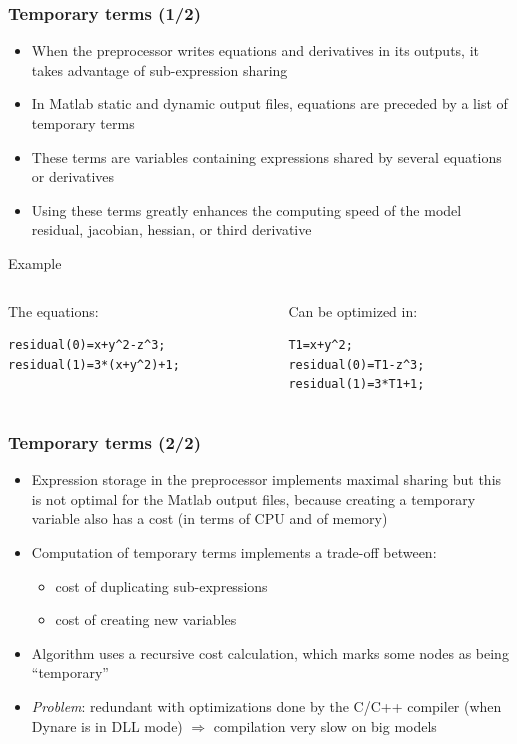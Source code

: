 \documentclass{beamer}
\begin{document}
\begin{frame}[fragile]
  \frametitle{Temporary terms (1/2)}
  \begin{itemize}
  \item When the preprocessor writes equations and derivatives in its outputs, it takes advantage of sub-expression sharing
  \item In Matlab static and dynamic output files, equations are preceded by a list of \alert{temporary terms}
  \item These terms are variables containing expressions shared by several equations or derivatives
  \item Using these terms greatly enhances the computing speed of the model residual, jacobian, hessian, or third derivative
  \end{itemize}
  \begin{block}{Example}
    \begin{columns}[t]
      \begin{column}{6cm}
        The equations:
\begin{verbatim}
residual(0)=x+y^2-z^3;
residual(1)=3*(x+y^2)+1;
\end{verbatim}
      \end{column}
      \begin{column}{4.8cm}
        Can be optimized in:
\begin{verbatim}
T1=x+y^2;
residual(0)=T1-z^3;
residual(1)=3*T1+1;
\end{verbatim}
      \end{column}
    \end{columns}
  \end{block}
\end{frame}

\begin{frame}
  \frametitle{Temporary terms (2/2)}
  \begin{itemize}
  \item Expression storage in the preprocessor implements maximal sharing but this is not optimal for the Matlab output files, because creating a temporary variable also has a cost (in terms of CPU and of memory)
  \item Computation of temporary terms implements a trade-off between:
    \begin{itemize}
    \item cost of duplicating sub-expressions
    \item cost of creating new variables
    \end{itemize}
  \item Algorithm uses a recursive cost calculation, which marks some nodes as being ``temporary''
  \item \textit{Problem}: redundant with optimizations done by the C/C++ compiler (when Dynare is in DLL mode) $\Rightarrow$ compilation very slow on big models
  \end{itemize}
\end{frame}
\end{document}
